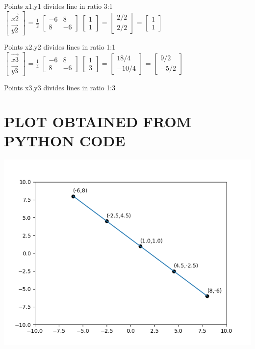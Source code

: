 \documentclass[12pt,a4paper,twoside]{article}
\begin{document}
Points x1,y1 divides line in ratio 3:1\\

$\begin{bmatrix}
\vec{x2}\\
\vec{y2}
\end{bmatrix}$
= $\frac{1}{2}$ 
$\begin{bmatrix}
-6 & 8\\
8 & -6
\end{bmatrix}$
$\begin{bmatrix}
1\\
1
\end{bmatrix}$
=
$\begin{bmatrix}
2/2\\
2/2
\end{bmatrix}$
=
$\begin{bmatrix}
1\\
1
\end{bmatrix}$

Points x2,y2 divides lines in ratio 1:1\\

$\begin{bmatrix}
\vec{x3}\\
\vec{y3}
\end{bmatrix}$
= $\frac{1}{4}$
$\begin{bmatrix}
-6 & 8\\
8 & -6
\end{bmatrix}$
$\begin{bmatrix}
1\\
3
\end{bmatrix}$
= $\begin{bmatrix}
18/4\\
-10/4
\end{bmatrix}$
= $\begin{bmatrix}
9/2\\
-5/2
\end{bmatrix}$

Points x3,y3 divides lines in ratio 1:3\\
\section{PLOT OBTAINED FROM PYTHON CODE}
\includegraphics[scale=0.5]{Figure_1.png}
\end{document}
